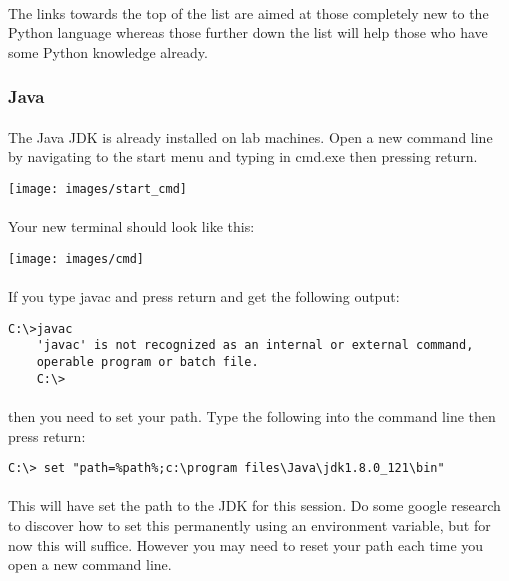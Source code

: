 \documentclass[10pt, a4paper, twosize]{article}
\begin{document}
\paragraph{} The links towards the top of the list are aimed at those completely new to the Python language whereas those further down the list will help those who have some Python knowledge already.

\subsubsection{Java}

\paragraph{} The Java JDK is already installed on lab machines. Open a new command line by navigating to the start menu and typing in cmd.exe then pressing return.


\texttt{[image: images/start\_cmd]}

\paragraph{} Your new terminal should look like this:

\texttt{[image: images/cmd]}

\paragraph{} If you type javac and press return and get the following output:

\begin{lstlisting}[style=DOS]
    C:\>javac
    'javac' is not recognized as an internal or external command,
    operable program or batch file.
    C:\>
\end{lstlisting}

\paragraph{} then you need to set your path. Type the following into the command line then press return:

\begin{lstlisting}[style=DOS]
    C:\> set "path=%path%;c:\program files\Java\jdk1.8.0_121\bin"
\end{lstlisting}


\paragraph{} This will have set the path to the JDK for this session. Do some google research to discover how to set this permanently using an environment variable, but for now this will suffice. However you may need to reset your path each time you open a new command line.
\end{document}

